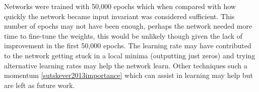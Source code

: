 Networks were trained with 50,000 epochs which when compared with how quickly the network became input invariant was considered sufficient.
This number of epochs may not have been enough, perhaps the network needed more time to fine-tune the weights, this would be unlikely though given the lack of improvement in the first 50,000 epochs. 
The learning rate may have contributed to the network getting stuck in a local minima (outputting just zeros) and trying alternative learning rates may help the network learn.
Other techniques such a momentum \ref{sutskever2013importance} which can assist in learning may help but are left as future work.






























